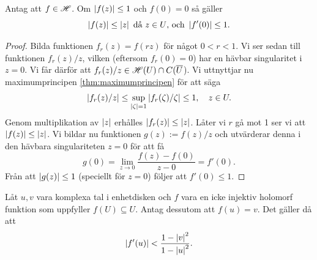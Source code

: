 \begin{lemma}
	Antag att $f \in \mathscr{H}$. Om $\left\lvert f(z) \right\rvert \le 1$ och $f(0)=0$ så gäller
	\begin{equation*}
		\left\lvert f(z) \right\rvert \le \left\lvert z \right\rvert \text{ då }z \in U \text{, och } \left\lvert f'(0) \right\rvert \le 1.
	\end{equation*}
\end{lemma}

\begin{proof}
	Bilda funktionen $f_r(z) = f(rz)$ för något $0 < r < 1$. Vi ser sedan till funktionen $f_r(z)/z$, vilken (eftersom $f_r(0)=0$) har en hävbar singularitet i $z=0$. Vi får därför att $f_r(z)/z \in \mathscr{H}(U) \cap C(\overline{U}$). Vi uttnyttjar nu maximumprincipen \ref{thm:maximumprincipen} för att säga
	\begin{equation*}
		\left\lvert f_r(z)/z \right\rvert \le \sup_{\left\lvert \zeta \right\rvert = 1} \left\lvert f_r(\zeta)/\zeta \right\rvert \le 1, \quad z \in U.
	\end{equation*}
	Genom multiplikation av $\left\lvert z \right\rvert$ erhålles $\left\lvert f_r(z) \right\rvert \le \left\lvert z \right\rvert$. Låter vi $r$ gå mot 1 ser vi att $\left\lvert f(z) \right\rvert \le \left\lvert z \right\rvert$. Vi bildar nu funktionen $g(z) := f(z)/z$ och utvärderar denna i den hävbara singulariteten $z=0$ för att få
	\begin{equation*}
		g(0) = \lim_{z \to 0} \frac{f(z) - f(0)}{z - 0} = f'(0).
	\end{equation*}
	Från att $\left\lvert g(z) \right\rvert \le 1$ (speciellt för $z=0$) följer att $f'(0) \le 1$.
\end{proof}

\begin{corollarium} \label{cor:schwarz}
	Låt $u, v$ vara komplexa tal i enhetdisken och $f$ vara en icke injektiv holomorf funktion som uppfyller $f(U) \subseteq U$. Antag dessutom att $f(u) = v$. Det gäller då att
	\begin{equation*}
		\left\lvert f'(u) \right\rvert < \frac{1-\left\lvert v \right\rvert^2}{1-\left\lvert u \right\rvert^2}.
	\end{equation*}
\end{corollarium}


